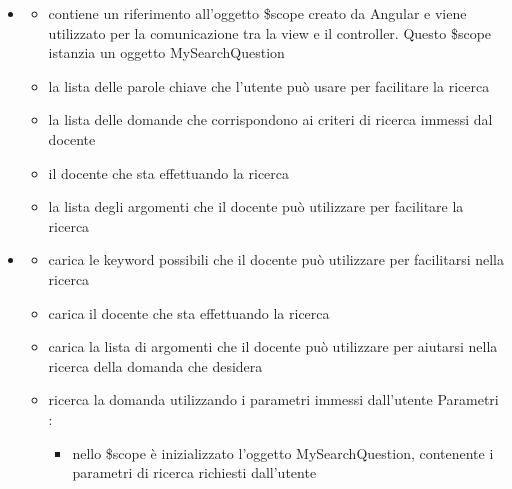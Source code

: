 \begin{itemize}
\item {}
\begin{itemize}
\item {}
\newline
contiene un riferimento all'oggetto \$scope creato da Angular e viene utilizzato per la comunicazione tra la view e il controller. Questo \$scope istanzia un oggetto MySearchQuestion
\item {}
\newline
la lista delle parole chiave che l'utente può usare per facilitare la ricerca
\item {}
\newline
la lista delle domande che corrispondono ai criteri di ricerca immessi dal docente
\item {}
\newline
il docente che sta effettuando la ricerca
\item {}
\newline
la lista degli argomenti che il docente può utilizzare per facilitare la ricerca
\end{itemize}
\item {}
\begin{itemize}
\item {}
\newline
carica le keyword possibili che il docente può utilizzare per facilitarsi nella ricerca
\newline
\item {}
\newline
carica il docente che sta effettuando la ricerca
\newline
\item {}
\newline
carica la lista di argomenti che il docente può utilizzare per aiutarsi nella ricerca della domanda che desidera
\newline
\item {}
\newline
ricerca la domanda utilizzando i parametri immessi dall'utente
\newline
Parametri :
\begin{itemize}
\item {}
\newline
nello \$scope è inizializzato l'oggetto MySearchQuestion, contenente i parametri di ricerca richiesti dall'utente
\end{itemize}
\end{itemize}
\end{itemize}
